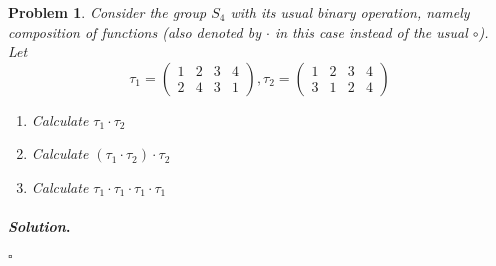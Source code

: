 \documentclass[reqno]{amsart}
\theoremstyle{plain}
\newtheorem{problem}{Problem}
\theoremstyle{definition}
\newenvironment{solution}{\paragraph{\emph{Solution}.}}{\hfill$\square$}
\begin{document}
\begin{problem}
Consider the group $S_{4}$ with its usual binary operation, namely composition of functions (also denoted by $\cdot$ in this case instead of the usual $\circ$).  Let
$$\tau_{1} = \left( \begin{smallmatrix} 1 & 2 & 3 & 4 \\ 2 & 4 & 3 & 1 \end{smallmatrix}\right), \tau_{2} =  \left( \begin{smallmatrix} 1 & 2 & 3 & 4 \\ 3 & 1 & 2 & 4 \end{smallmatrix}\right)$$
\begin{enumerate}
\item Calculate $\tau_{1} \cdot \tau_{2}$
\item Calculate $(\tau_{1} \cdot \tau_{2}) \cdot \tau_{2}$
\item Calculate $\tau_{1} \cdot \tau_{1} \cdot \tau_{1} \cdot \tau_{1}$
\end{enumerate}
\end{problem}
\begin{solution}

\end{solution}
\end{document}
